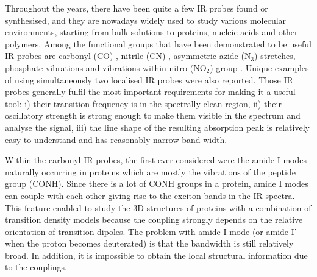\documentclass[b5paper,oneside,fleqn,11pt]{book}
\begin{document}
\begin{refsection}
Throughout the years, there have been quite a few IR probes found or synthesised, and
they are nowadays widely used to study various molecular environments, starting from bulk solutions
to proteins, nucleic acids and other polymers. \citep{Kim.Cho.ChemRev.2013,
Ma.Pazos.Zhang.Culik.Gai.AnnuRevPhysChem.2015,Waegele.Culik.Gai.JCPL.2011}
Among the functional groups that have been demonstrated to be useful IR probes
are carbonyl (CO) \citep{Fried.Bagchi.Boxer.Science.2014,Thielges.Axup.Wong.Lee.Chung.Schultz.Fayer.JPCB.2011}, 
nitrile (CN) \citep{Zhang.Markiewicz.Doerksen.Smith.Gai.PCCP.2015,Johnson.Londergan.Charkoudian.JACS.2014,
Waegele.Culik.Gai.JCPL.2011,Stafford.Ensign.Webb.JPCB.2010,
Silverman.Pitzer.Ankomah.Boxer.Fenlon.JPCB.2007,Suydam.Snow.Pande.Boxer.Science.2006},
asymmetric azide (N$_3$) \citep{Thielges.Axup.Wong.Lee.Chung.Schultz.Fayer.JPCB.2011,
Ye.Zaitseva.Caltabiano.Schertler.Sakmar.Deupi.Vogel.Nature.2010,Waegele.Culik.Gai.JCPL.2011,
Taskent-Sezgin.Chung.Banerjee.Nagarajan.Dyer.Carrico.Raleigh.AngewChemInt.2010,Oh.Lee.Joo.Han.Cho.JPCB.2008} 
stretches, phosphate vibrations \citep{Levinson.Bolte.Miller.Corcelli.Boxer.JACS.2011}
and vibrations within nitro (NO$_2$) group \citep{Smith.Linderman.Luskin.Brewer.JPCB.2011}. 
Unique examples of using simultaneously two localised IR probes
were also reported. \citep{Thielges.Axup.Wong.Lee.Chung.Schultz.Fayer.JPCB.2011}
Those IR probes
generally fulfil the most important requirements for making it a useful tool: i) their transition
frequency is in the spectrally clean region, ii) their oscillatory strength is strong enough
to make them visible in the spectrum and analyse the signal, iii) the line shape 
of the resulting absorption peak is relatively easy to understand and has reasonably
narrow band width. 

Within the carbonyl IR probes, the first ever considered were the amide I modes
naturally occurring in proteins which are mostly the vibrations of the peptide group (CONH). Since
there is a lot of CONH groups in a protein, amide I modes can couple with each other
giving rise to the exciton bands in the IR spectra. This feature enabled to study 
the 3D structures of proteins with a combination of transition density
models \citep{Hayashi.Mukamel.JPCB.2007} because the coupling strongly depends 
on the relative orientation of transition dipoles. 
The problem with amide I mode (or amide I' when the proton becomes deuterated)
is that the bandwidth is still relatively broad. In addition, it is impossible to
obtain the local structural information due to the couplings.


\end{refsection}
\end{document}
